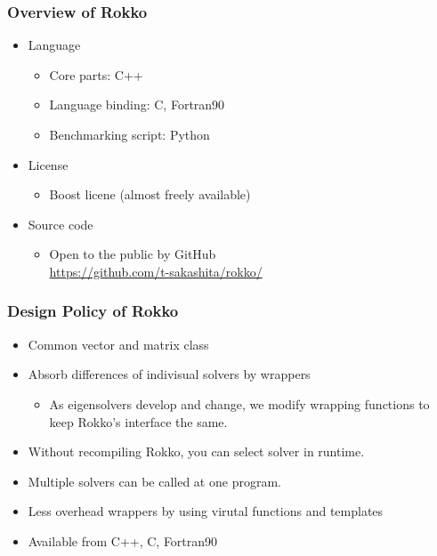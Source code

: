 \begin{frame}
  \frametitle{Overview of Rokko}
  \begin{itemize}
  \item Language
    \begin{itemize}
    \item Core parts: C++
    \item Language binding: C, Fortran90
    \item Benchmarking script: Python
    \end{itemize}
  \item License
    \begin{itemize}
    \item Boost licene (almost freely available)
    \end{itemize}
  \item Source code
    \begin{itemize}
    \item Open to the public by GitHub\\
          \url{https://github.com/t-sakashita/rokko/}
    \end{itemize}
  \end{itemize}
\end{frame}


\begin{frame}
  \frametitle{Design Policy of Rokko}
  \begin{itemize}
    \setlength{\itemsep}{1em}
  \item Common vector and matrix class
  \item Absorb differences of indivisual solvers by wrappers
    \begin{itemize}
    \item As eigensolvers develop and change, we modify wrapping functions to keep Rokko's interface the same.
    \end{itemize}
  \item Without recompiling Rokko, you can select solver in runtime.
  \item Multiple solvers can be called at one program.
  \item Less overhead wrappers by using virutal functions and templates
  \item Available from C++, C, Fortran90
  \end{itemize}
\end{frame}

